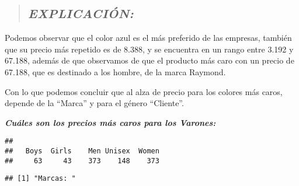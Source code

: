 \documentclass[
]{article}
\newenvironment{Shaded}{\begin{snugshade}}{\end{snugshade}}
\newcommand{\FunctionTok}[1]{\textcolor[rgb]{0.00,0.00,0.00}{#1}}
\newcommand{\NormalTok}[1]{#1}
\newcommand{\OtherTok}[1]{\textcolor[rgb]{0.56,0.35,0.01}{#1}}
\newcommand{\SpecialCharTok}[1]{\textcolor[rgb]{0.00,0.00,0.00}{#1}}
\newcommand{\StringTok}[1]{\textcolor[rgb]{0.31,0.60,0.02}{#1}}
\begin{document}
\begin{quote}
\hypertarget{explicaciuxf3n-7}{%
\subsection{\texorpdfstring{\textbf{\emph{EXPLICACIÓN:}}}{EXPLICACIÓN:}}\label{explicaciuxf3n-7}}
\end{quote}

Podemos observar que el color azul es el más preferido de las empresas,
también que su precio más repetido es de 8.388, y se encuentra en un
rango entre 3.192 y 67.188, además de que observamos de que el producto
más caro con un precio de 67.188, que es destinado a los hombre, de la
marca Raymond.

Con lo que podemos concluir que al alza de precio para los colores más
caros, depende de la ``Marca'' y para el género ``Cliente''.

\textbf{\emph{Cuáles son los precios más caros para los Varones:}}

\begin{Shaded}
\end{Shaded}

\begin{verbatim}
## 
##   Boys  Girls    Men Unisex  Women 
##     63     43    373    148    373
\end{verbatim}

\begin{Shaded}
\end{Shaded}

\begin{verbatim}
## [1] "Marcas: "
\end{verbatim}

\begin{Shaded}
\end{Shaded}
\end{document}
